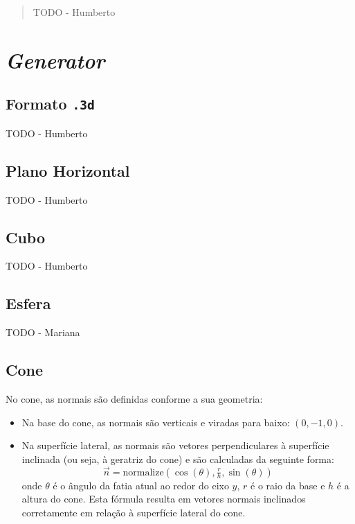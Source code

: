 \documentclass[12pt, a4paper]{article}
\begin{document}
\pagebreak

\begin{abstract}
    \noindent
    {\color{red} TODO - Humberto}
\end{abstract}

\section{\emph{Generator}}

\subsection{Formato \texttt{.3d}}

{\color{red} TODO - Humberto}

\subsection{Plano Horizontal}

{\color{red} TODO - Humberto}

\subsection{Cubo}

{\color{red} TODO - Humberto}

\subsection{Esfera}

{\color{red} TODO - Mariana}

\subsection{Cone}

No cone, as normais são definidas conforme a sua geometria:

\begin{itemize}
    \item Na base do cone, as normais são verticais e viradas para baixo: $(0, -1, 0)$.
    \item Na superfície lateral, as normais são vetores perpendiculares à superfície
    inclinada (ou seja, à geratriz do cone) e são calculadas da seguinte forma:
\[
\vec{n} = \text{normalize}(\cos(\theta), \tfrac{r}{h}, \sin(\theta))
\]
onde \( \theta \) é o ângulo da fatia atual ao redor do eixo \( y \), \( r \) é o raio da
base e \( h \) é a altura do cone.
Esta fórmula resulta em vetores normais inclinados corretamente em relação à superfície
lateral do cone.
\end{itemize}
\end{document}
